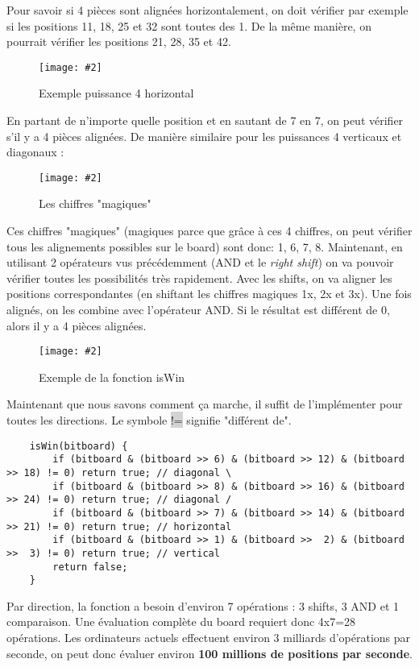 \documentclass[a4paper]{article}
\newcommand{\img}[3][]{
    \begin{figure}[H]
        \centering
        \texttt{[image: \#2]}
        \caption{#1}    
    \end{figure}
}
\newcommand{\inlinecode}[1]{\colorbox{lightgray}{#1}}
\begin{document}

    Pour savoir si 4 pièces sont alignées horizontalement, on doit vérifier par exemple si les positions 11, 18, 25 et 32 sont toutes des 1. De la même manière, on pourrait vérifier les positions 21, 28, 35 et 42.

    \img[Exemple puissance 4 horizontal]{Images/CheckWinHorizontal.png}{0.5}

    En partant de n'importe quelle position et en sautant de 7 en 7, on peut vérifier s'il y a 4 pièces alignées. De manière similaire pour les puissances 4 verticaux et diagonaux :

    \img[Les chiffres "magiques"]{Images/MagicNumbers.png}{0.5}

    Ces chiffres "magiques" (magiques parce que grâce à ces 4 chiffres, on peut vérifier tous les alignements possibles sur le board) sont donc: 1, 6, 7, 8. Maintenant, en utilisant 2 opérateurs vus précédemment (AND et le \textit{right shift}) on va pouvoir vérifier toutes les possibilités très rapidement. Avec les shifts, on va aligner les positions correspondantes (en shiftant les chiffres magiques 1x, 2x et 3x). Une fois alignés, on les combine avec l'opérateur AND. Si le résultat est différent de 0, alors il y a 4 pièces alignées.

    \img[Exemple de la fonction isWin]{Images/ExempleIsWin.png}{0.8}

    \newpage
    Maintenant que nous savons comment ça marche, il suffit de l'implémenter pour toutes les directions. Le symbole \inlinecode{!=} signifie "différent de".
    \begin{lstlisting}
    isWin(bitboard) {
        if (bitboard & (bitboard >> 6) & (bitboard >> 12) & (bitboard >> 18) != 0) return true; // diagonal \
        if (bitboard & (bitboard >> 8) & (bitboard >> 16) & (bitboard >> 24) != 0) return true; // diagonal /
        if (bitboard & (bitboard >> 7) & (bitboard >> 14) & (bitboard >> 21) != 0) return true; // horizontal
        if (bitboard & (bitboard >> 1) & (bitboard >>  2) & (bitboard >>  3) != 0) return true; // vertical
        return false;
    }
    \end{lstlisting}

    Par direction, la fonction a besoin d'environ 7 opérations : 3 shifts, 3 AND et 1 comparaison. Une évaluation complète du board requiert donc 4x7=28 opérations. Les ordinateurs actuels effectuent environ 3 milliards d'opérations par seconde, on peut donc évaluer environ \textbf{100 millions de positions par seconde}.
\end{document}
